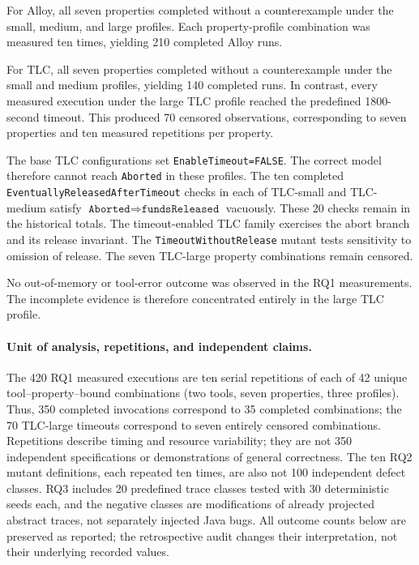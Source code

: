 For Alloy, all seven properties completed without a counterexample
under the small, medium, and large profiles. Each property-profile
combination was measured ten times, yielding 210 completed Alloy runs.

For TLC, all seven properties completed without a counterexample under
the small and medium profiles, yielding 140 completed runs. In
contrast, every measured execution under the large TLC profile reached
the predefined 1800-second timeout. This produced 70 censored
observations, corresponding to seven properties and ten measured
repetitions per property.

The base TLC configurations set \texttt{EnableTimeout=FALSE}. The correct
model therefore cannot reach \texttt{Aborted} in these profiles. The ten
completed \texttt{EventuallyReleasedAfterTimeout} checks in each of TLC-small
and TLC-medium satisfy \(\texttt{Aborted}\Rightarrow\texttt{fundsReleased}\)
vacuously. These 20 checks remain in the historical totals. The timeout-enabled
TLC family exercises the abort branch and its release invariant. The
\texttt{TimeoutWithoutRelease} mutant tests sensitivity to omission of release.
The seven TLC-large property combinations remain censored.

No out-of-memory or tool-error outcome was observed in the RQ1
measurements. The incomplete evidence is therefore concentrated
entirely in the large TLC profile.

\paragraph{Unit of analysis, repetitions, and independent claims.}
The 420 RQ1 measured executions are ten serial repetitions of each of 42
unique tool--property--bound combinations (two tools, seven properties,
three profiles). Thus, 350 completed invocations correspond to 35 completed
combinations; the 70 TLC-large timeouts correspond to seven entirely censored
combinations. Repetitions describe timing and resource variability; they are
not 350 independent specifications or demonstrations of general correctness.
The ten RQ2 mutant definitions, each repeated ten times, are also not 100
independent defect classes. RQ3 includes 20 predefined trace classes tested
with 30 deterministic seeds each, and the negative classes are modifications
of already projected abstract traces, not separately injected Java bugs.
All outcome counts below are preserved as reported; the retrospective audit
changes their interpretation, not their underlying recorded values.

